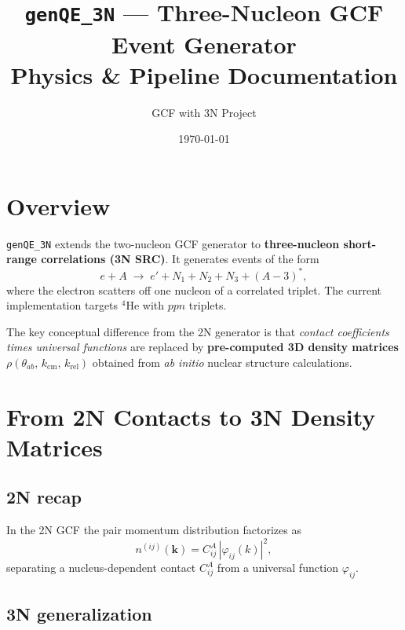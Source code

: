 \documentclass[11pt,a4paper]{article}
\title{\texttt{genQE\_3N} --- Three-Nucleon GCF Event Generator\\[4pt]
       \large Physics \& Pipeline Documentation}
\author{GCF with 3N Project}
\date{\today}
\newcommand{\vect}[1]{\bm{#1}}
\begin{document}
\maketitle
\tableofcontents
\newpage

\section{Overview}

\texttt{genQE\_3N} extends the two-nucleon GCF generator to
\textbf{three-nucleon short-range correlations (3N SRC)}.  It generates
events of the form
\begin{equation}
  e + A \;\longrightarrow\; e' + N_{1} + N_{2} + N_{3} + (A{-}3)^{*},
\end{equation}
where the electron scatters off one nucleon of a correlated triplet.
The current implementation targets $^{4}$He with $ppn$ triplets.

The key conceptual difference from the 2N generator is that
\emph{contact coefficients times universal functions} are replaced by
\textbf{pre-computed 3D density matrices} $\rho(\theta_{ab},\,k_{\text{cm}},\,k_{\text{rel}})$
obtained from \textit{ab initio} nuclear structure calculations.

\section{From 2N Contacts to 3N Density Matrices}

\subsection{2N recap}

In the 2N GCF the pair momentum distribution factorizes as
\begin{equation}
  n^{(ij)}(\vect{k}) = C_{ij}^{A}\,|\varphi_{ij}(k)|^{2},
\end{equation}
separating a nucleus-dependent contact $C_{ij}^{A}$ from a universal function
$\varphi_{ij}$.

\subsection{3N generalization}
\end{document}
